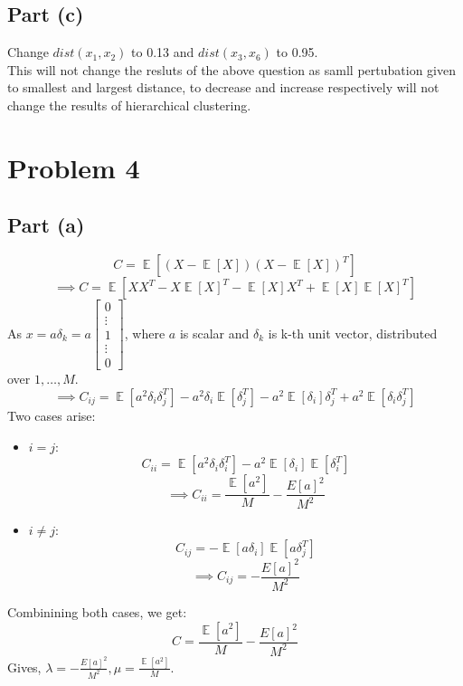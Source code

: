 \documentclass[12pt]{article}
\DeclareMathOperator{\E}{\mathbb{E}}
\begin{document}
\subsection*{Part (c)}
Change $dist(x_1, x_2)$ to 0.13 and $dist(x_3, x_6)$ to 0.95. \\
This will not change the resluts of the above question as samll pertubation given to smallest and largest distance, to decrease and increase respectively will not change the results of hierarchical clustering.

\section*{Problem 4}
\subsection*{Part (a)}
\begin{equation*}
    C = \E[(X - \E[X])(X - \E[X])^T]
\end{equation*}
\begin{equation*}
    \implies
    C = \E[XX^T - X\E[X]^T - \E[X]X^T + \E[X]\E[X]^T]
\end{equation*}
As $ x = a\delta_k = a \begin{bmatrix} 0 \\ \vdots \\ 1 \\ \vdots \\ 0 \end{bmatrix} $, where $a$ is scalar and $\delta_k$ is k-th unit vector, distributed over $1, \dots, M$.
\begin{equation*}
    \implies
    C_{ij} = \E[a^2 \delta_i \delta_j^T] - a^2 \delta_i \E[ \delta_j^T] - a^2 \E[ \delta_i] \delta_j^T + a^2 \E[\delta_i \delta_j^T]
\end{equation*}
Two cases arise:
\begin{itemize}
    \item $i = j$:
    \begin{equation*}
        C_{ii} = \E[a^2 \delta_i \delta_i^T] - a^2 \E[ \delta_i ] \E[ \delta_i^T] 
    \end{equation*}
    \begin{equation*}
        \implies
        C_{ii} = \frac{\E[a^2]}{M} - \frac{E[a]^2}{M^2}
    \end{equation*}
    \item $i \neq j$:
    \begin{equation*}
        C_{ij} = - \E[a \delta_i] \E[a \delta_j^T]
    \end{equation*}
    \begin{equation*}
        \implies
        C_{ij} = - \frac{E[a]^2}{M^2}
    \end{equation*}
\end{itemize}
Combinining both cases, we get:
\begin{equation*}
    C = \frac{\E[a^2]}{M}  - \frac{E[a]^2}{M^2} 
\end{equation*}
Gives, $\lambda = - \frac{E[a]^2}{M^2}, \mu = \frac{\E[a^2]}{M}$.
\end{document}

